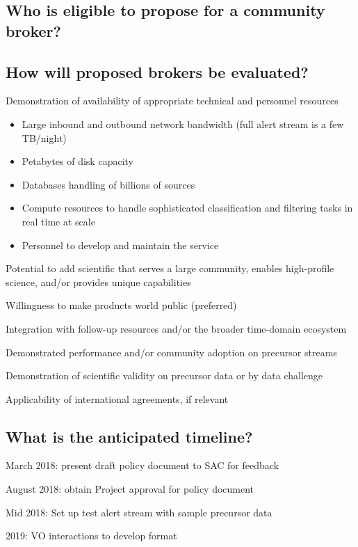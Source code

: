 \subsection{Who is eligible to propose for a community broker?}

\subsection{How will proposed brokers be evaluated?}

Demonstration of availability of appropriate technical and personnel resources
\begin{itemize}
	\item Large inbound and outbound network bandwidth (full alert stream is a few TB/night)
	\item Petabytes of disk capacity
	\item Databases handling of billions of sources
	\item Compute resources to handle sophisticated classification and filtering tasks in real time at scale
	\item Personnel to develop and maintain the service
\end{itemize}


Potential to add scientific that serves a large community, enables high-profile science, and/or provides unique capabilities

Willingness to make products world public (preferred)

Integration with follow-up resources and/or the broader time-domain ecosystem

Demonstrated performance and/or community adoption on precursor streams

Demonstration of scientific validity on precursor data or by data challenge

Applicability of international agreements, if relevant


\subsection{What is the anticipated timeline?}

March 2018: present draft policy document to SAC for feedback

August 2018: obtain Project approval for policy document

Mid 2018: Set up test alert stream with sample precursor data

2019: VO interactions to develop format

